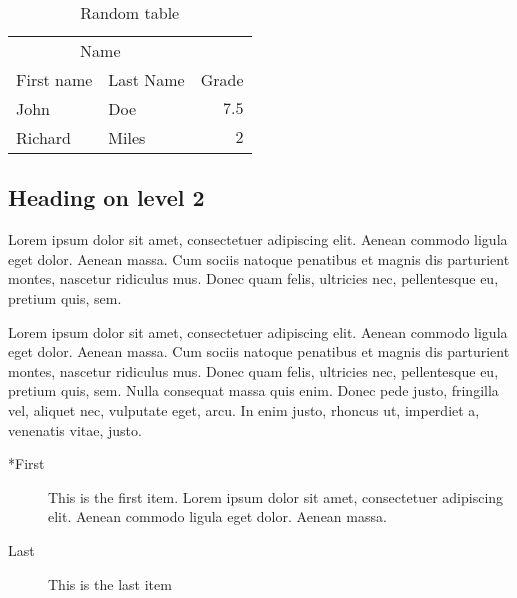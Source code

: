 \documentclass[ DIV=calc,%
                            paper=a4,%
                            fontsize=11pt,%
                            twocolumn]{scrartcl}                        %
\begin{document}
\begin{table}
\caption{Random table}
\centering
    \begin{tabular}{llr}
        \toprule
        \multicolumn{2}{c}{Name} \\
        \cmidrule(r){1-2}
            First name & Last Name & Grade \\
        \midrule
            John & Doe & $7.5$ \\
            Richard & Miles & $2$ \\
        \bottomrule
    \end{tabular}
\end{table}

\subsection*{Heading on level 2}
Lorem ipsum dolor sit amet, consectetuer adipiscing elit. Aenean commodo ligula eget dolor. Aenean massa. Cum sociis natoque penatibus et magnis dis parturient montes, nascetur ridiculus mus. Donec quam felis, ultricies nec, pellentesque eu, pretium quis, sem. 

Lorem ipsum dolor sit amet, consectetuer adipiscing elit. Aenean commodo ligula eget dolor. Aenean massa. Cum sociis natoque penatibus et magnis dis parturient montes, nascetur ridiculus mus. Donec quam felis, ultricies nec, pellentesque eu, pretium quis, sem. Nulla consequat massa quis enim. Donec pede justo, fringilla vel, aliquet nec, vulputate eget, arcu. In enim justo, rhoncus ut, imperdiet a, venenatis vitae, justo. 
\begin{description}
    \item[*First] This is the first item. Lorem ipsum dolor sit amet, consectetuer adipiscing elit. Aenean commodo ligula eget dolor. Aenean massa.
    \item[Last] This is the last item
\end{description}
\end{document}
